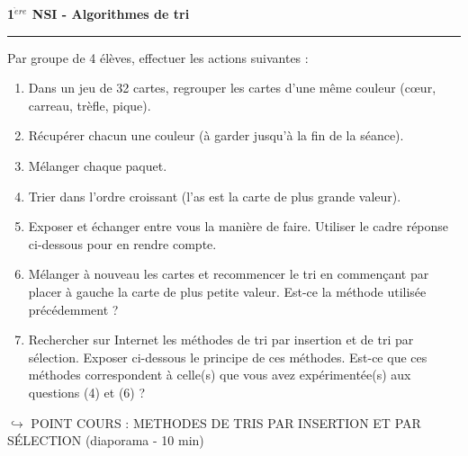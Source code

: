 \documentclass[a4paper,french]{article}
\newcounter{exonum}
\newcommand{\Exo}{\addtocounter{exonum}{1}{{\large \textbf {Exercice \theexonum .}}}}
\newcommand{\Titre}[1]{\textbf{{\large{#1}}}}
\begin{document}
\pagestyle{empty}
\parindent 0mm

\begin{center}
\Titre{1$^{\grave{e}re}$ NSI  -  Algorithmes de tri}
\\[5mm]
\end{center}
\hrule
\vspace*{5mm}

\Exo

Par groupe de 4 élèves, effectuer les actions suivantes :
\begin{enumerate}
\item Dans un jeu de 32 cartes, regrouper les cartes d'une même couleur (cœur, carreau, trèfle, pique).
\item Récupérer chacun une couleur (à garder jusqu'à la fin de la séance).

\item Mélanger chaque paquet.

\item Trier dans l'ordre croissant (l'as est la carte de plus grande valeur).

\item Exposer et échanger entre vous la manière de faire. Utiliser le cadre réponse ci-dessous pour en rendre compte.

\noindent{}
\medskip

\item Mélanger à nouveau les cartes et recommencer le tri en commençant par placer à gauche la carte de plus petite valeur. Est-ce la méthode utilisée précédemment ?

\noindent{}
\medskip

\item Rechercher sur Internet les méthodes de tri par insertion et de tri par sélection. Exposer ci-dessous le principe de ces méthodes. Est-ce que ces méthodes correspondent à celle(s) que vous avez expérimentée(s) aux questions (4) et (6) ?

\noindent{}
\end{enumerate}
\bigskip

$\hookrightarrow$ POINT COURS : METHODES DE TRIS PAR INSERTION ET PAR SÉLECTION (diaporama - 10 min)
\pagebreak
\end{document}
